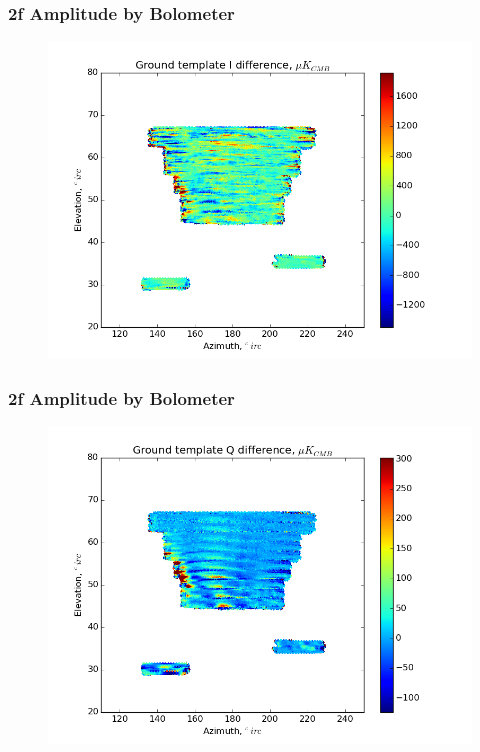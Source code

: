\documentclass{beamer}
\begin{document}
\begin{frame}
\frametitle{2f Amplitude by Bolometer}
\begin{figure}
\includegraphics[width=0.9\linewidth]{dI_gt_AMP_2F_BY_BOLO.png}
\end{figure}
\end{frame}

\begin{frame}
\frametitle{2f Amplitude by Bolometer}
\begin{figure}
\includegraphics[width=0.9\linewidth]{dQ_gt_AMP_2F_BY_BOLO.png}
\end{figure}
\end{frame}
\end{document}
